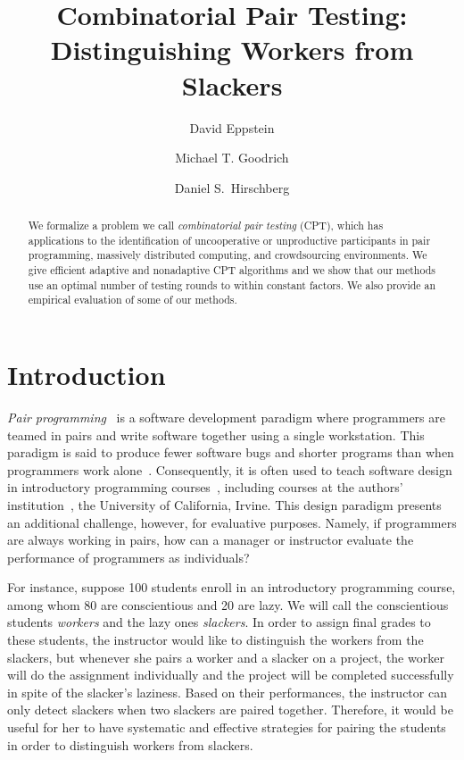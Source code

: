 \documentclass[11pt]{llncs}
\begin{document}
\ifFull
\pagestyle{plain}
\fi
\renewenvironment{proof}{\noindent{\bf Proof:}}{\hspace*{\fill}\rule{6pt}{6pt}\bigskip}

\title{Combinatorial Pair Testing:\\ 
       Distinguishing Workers from Slackers}

\author{David Eppstein \and Michael T. Goodrich \and Daniel S.~Hirschberg}


\date{}

\maketitle

\begin{abstract}
We formalize a problem we call 
\emph{combinatorial pair testing} (CPT), which has applications
to the identification of uncooperative or unproductive participants 
in pair programming, massively distributed computing,
and crowdsourcing environments.
We give efficient adaptive and nonadaptive CPT algorithms and we show
that our methods use an optimal number of testing rounds to within
constant factors.
We also provide an empirical evaluation of some of our methods.
\end{abstract}

\section{Introduction}
\emph{Pair programming}~\cite{WilKes-03} 
is a software development paradigm where
programmers are teamed in pairs and write software together using a single
workstation.
This paradigm is said to produce fewer software bugs
and shorter programs than when programmers work alone~\cite{WilKesCun-IS-00}.
Consequently, it is often used to teach software design in
introductory programming courses~\cite{NagWilFer-SIGCSE-03}, 
including courses at the authors' institution~\cite{Jacobson:2008}, 
the University of California, Irvine.
This design paradigm presents an additional 
challenge, however, for evaluative purposes.
Namely, if programmers are always
working in pairs, how can a manager or instructor evaluate the performance of
programmers as individuals?

For instance, suppose 100 students enroll in an introductory programming course, among whom 80 are conscientious and 20 are lazy. We will call the conscientious students
\emph{workers} and the lazy ones \emph{slackers}.
In order to assign final grades to these students, the instructor would like to distinguish the workers from
the slackers, but whenever she pairs a worker and a slacker
on a project, the worker will do the assignment
individually and the project will be completed successfully in spite of the
slacker's laziness. 
Based on their performances, the instructor can only detect
slackers when two slackers are paired together.
Therefore, it would be useful for her to have systematic and effective
strategies for pairing the students in order to distinguish workers from slackers.
\end{document}
